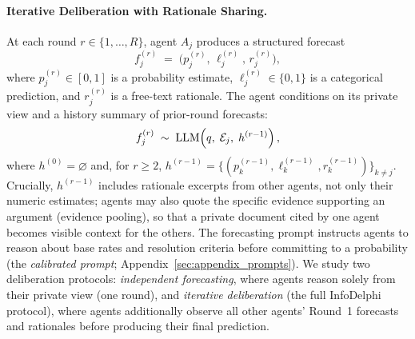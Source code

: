\paragraph{Iterative Deliberation with Rationale Sharing.}
\label{sec:deliberation}
At each round $r \in \{1, \dots, R\}$, agent $A_j$ produces a structured forecast
\begin{equation}
    f_j^{(r)} \;=\; \bigl(p_j^{(r)},\, \ell_j^{(r)},\, r_j^{(r)}\bigr),
\end{equation}
where $p_j^{(r)} \in [0,1]$ is a probability estimate, $\ell_j^{(r)} \in \{0,1\}$ is a categorical prediction, and $r_j^{(r)}$ is a free-text rationale.
The agent conditions on its private view and a history summary of prior-round forecasts:
\begin{equation}
    f_j^{(r)} \;\sim\; \mathrm{LLM}\!\left(q,\;\mathcal{E}_{j},\;h^{(r-1)}\right),
    \label{eq:agent}
\end{equation}
where $h^{(0)} = \varnothing$ and, for $r \geq 2$,
$h^{(r-1)} = \{(p_k^{(r-1)}, \ell_k^{(r-1)}, r_k^{(r-1)})\}_{k \neq j}$.
Crucially, $h^{(r-1)}$ includes rationale excerpts from other agents, not only their numeric estimates; agents may also quote the specific evidence supporting an argument (evidence pooling), so that a private document cited by one agent becomes visible context for the others.
The forecasting prompt instructs agents to reason about base rates and resolution criteria before committing to a probability (the \emph{calibrated prompt}; Appendix~\ref{sec:appendix_prompts}).
We study two deliberation protocols: \textit{independent forecasting}, where agents reason solely from their private view (one round), and \textit{iterative deliberation} (the full InfoDelphi protocol), where agents additionally observe all other agents' Round~1 forecasts and rationales before producing their final prediction.

